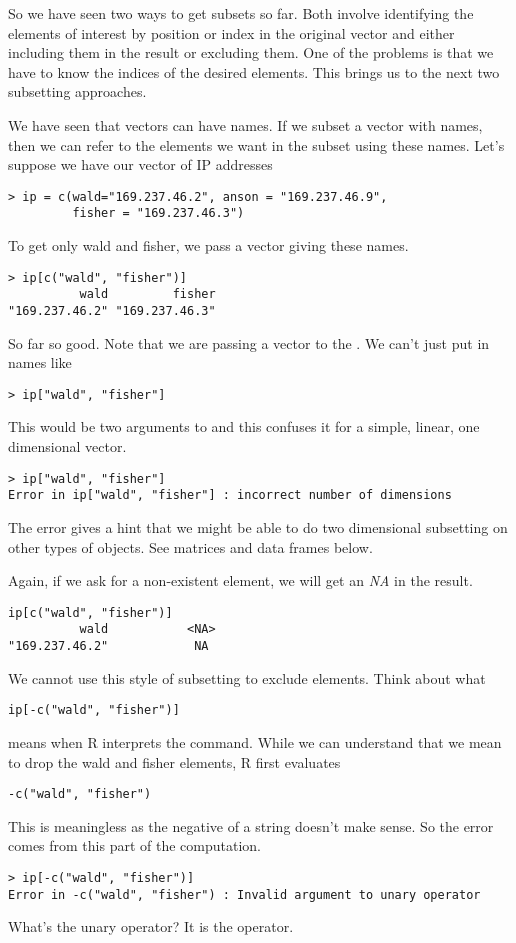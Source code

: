 So we have seen two ways to get subsets so far. Both involve
identifying the elements of interest by position or index in the
original vector and either including them in the result or excluding
them. One of the problems is that we have to know the indices of the
desired elements. This brings us to the next two subsetting
approaches.

We have seen that vectors can have names. If we subset a vector with
names, then we can refer to the elements we want in the subset using
these names. Let's suppose we have our vector of IP addresses
\begin{verbatim}
> ip = c(wald="169.237.46.2", anson = "169.237.46.9",
         fisher = "169.237.46.3")
\end{verbatim}
To get only wald and fisher, we pass a vector giving these names. 
\begin{verbatim}
> ip[c("wald", "fisher")]
          wald         fisher 
"169.237.46.2" "169.237.46.3" 
\end{verbatim}
So far so good. Note that we are passing a vector to the
\SOperator{[}. We can't just put in names like
\begin{verbatim}
> ip["wald", "fisher"]
\end{verbatim}
This would be two arguments to \SOperator{[} and this confuses it for
a simple, linear, one dimensional vector.
\begin{verbatim}
> ip["wald", "fisher"]
Error in ip["wald", "fisher"] : incorrect number of dimensions
\end{verbatim}
The error gives a hint that we might be able to do two dimensional
subsetting on other types of objects. See matrices and data frames
below.

Again, if we ask for a non-existent element, we will get an
\textit{NA} in the result.
\begin{verbatim}
ip[c("wald", "fisher")]
          wald           <NA> 
"169.237.46.2"            NA 
\end{verbatim}
We cannot use this style of subsetting to exclude elements. Think
about what
\begin{verbatim}
ip[-c("wald", "fisher")]
\end{verbatim} 
means when R interprets the command. While we can understand that we
mean to drop the wald and fisher elements, R first evaluates
\begin{verbatim}
-c("wald", "fisher")
\end{verbatim}
This is meaningless as the negative of a string doesn't make sense. So
the error comes from this part of the computation.
\begin{verbatim}
> ip[-c("wald", "fisher")]
Error in -c("wald", "fisher") : Invalid argument to unary operator
\end{verbatim}
What's the unary operator? It is the \SOperator{-} operator. 

